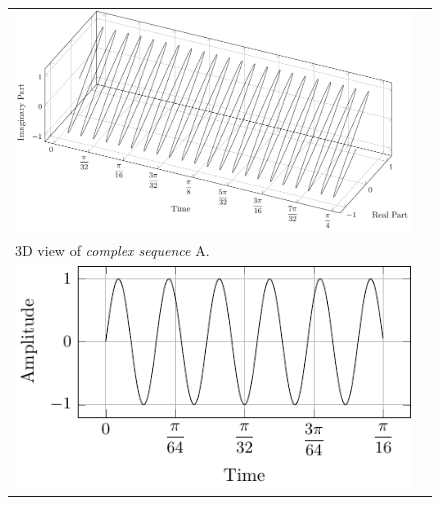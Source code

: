 \documentclass[../../course]{subfiles}
\begin{document}
\begin{figure} [H]

    \renewcommand{\arraystretch}{0.7}
    \centering
    \begin{NiceTabularX} {\textwidth} {
            *{2}{>{\centering\arraybackslash}X}
        }

         {
             {
                \includegraphics[height = \textheight] {tikzpics/plotComplexA.pdf}
            }
        }

        &
        \\

         {
            \vbox{
                 {3D view of \emph{complex sequence} A.}
                \label{plt:cmplxA}
            }
        }

        &
        \\

         {
             {
                \includegraphics[height = \textheight] {tikzpics/plotShortX1.pdf}
            }
        }

        &


\end{NiceTabularX}
\end{figure}
\end{document}
